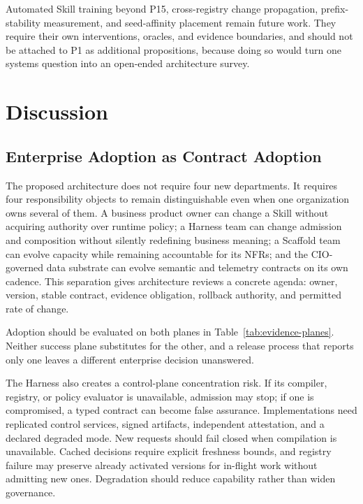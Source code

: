 Automated Skill training beyond P15, cross-registry change propagation, prefix-stability measurement, and seed-affinity placement remain future work. They require their own interventions, oracles, and evidence boundaries, and should not be attached to P1 as additional propositions, because doing so would turn one systems question into an open-ended architecture survey.

\section{Discussion}
\label{sec:discussion}

\subsection{Enterprise Adoption as Contract Adoption}

The proposed architecture does not require four new departments. It requires four responsibility objects to remain distinguishable even when one organization owns several of them. A business product owner can change a Skill without acquiring authority over runtime policy; a Harness team can change admission and composition without silently redefining business meaning; a Scaffold team can evolve capacity while remaining accountable for its NFRs; and the CIO-governed data substrate can evolve semantic and telemetry contracts on its own cadence. This separation gives architecture reviews a concrete agenda: owner, version, stable contract, evidence obligation, rollback authority, and permitted rate of change.

Adoption should be evaluated on both planes in Table~\ref{tab:evidence-planes}. Neither success plane substitutes for the other, and a release process that reports only one leaves a different enterprise decision unanswered.

The Harness also creates a control-plane concentration risk. If its compiler, registry, or policy evaluator is unavailable, admission may stop; if one is compromised, a typed contract can become false assurance. Implementations need replicated control services, signed artifacts, independent attestation, and a declared degraded mode. New requests should fail closed when compilation is unavailable. Cached decisions require explicit freshness bounds, and registry failure may preserve already activated versions for in-flight work without admitting new ones. Degradation should reduce capability rather than widen governance.

